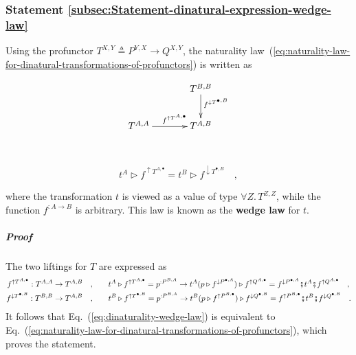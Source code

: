 \subsubsection{Statement \label{subsec:Statement-dinatural-expression-wedge-law}\ref{subsec:Statement-dinatural-expression-wedge-law}}

Using the profunctor $T^{X,Y}\triangleq P^{Y,X}\rightarrow Q^{X,Y}$,
the naturality law~(\ref{eq:naturality-law-for-dinatural-transformations-of-profunctors})
is written as

\begin{wrapfigure}[9]{l}{0.24\columnwidth}%
\vspace{-1.5\baselineskip}
\[
\xymatrix{\xyScaleY{2.0pc}\xyScaleX{3.0pc} & T^{B,B}\ar[d]\sp(0.37){f^{\downarrow T^{\bullet,B}}}\\
T^{A,A}\ar[r]\sp(0.5){~~~f^{\uparrow T^{A,\bullet}}} & T^{A,B}
}
\]

\vspace{-0\baselineskip}
\end{wrapfigure}%

~\vspace{-0.8\baselineskip}

\begin{equation}
t^{A}\triangleright f^{\uparrow T^{A,\bullet}}=t^{B}\triangleright f^{\downarrow T^{\bullet,B}}\quad,\label{eq:dinaturality-wedge-law}
\end{equation}
\vspace{-0.8\baselineskip}

\noindent where the transformation $t$ is viewed as a value of type
$\forall Z.\,T^{Z,Z}$, while the function $f^{:A\rightarrow B}$
is arbitrary. This law is known as the \textbf{wedge law}
for $t$.

\subparagraph{Proof}

The two liftings for $T$ are expressed as
\begin{align*}
f^{\uparrow T^{A,\bullet}}:T^{A,A}\rightarrow T^{A,B}\quad, & \quad\quad t^{A}\triangleright f^{\uparrow T^{A,\bullet}}=p^{:P^{B,A}}\rightarrow t^{A}(p\triangleright f^{\downarrow P^{\bullet,A}})\triangleright f^{\uparrow Q^{A,\bullet}}=f^{\downarrow P^{\bullet,A}}\bef t^{A}\bef f^{\uparrow Q^{A,\bullet}}\quad,\\
f^{\downarrow T^{\bullet,B}}:T^{B,B}\rightarrow T^{A,B}\quad, & \quad\quad t^{B}\triangleright f^{\uparrow T^{\bullet,B}}=p^{:P^{B,A}}\rightarrow t^{B}(p\triangleright f^{\uparrow P^{B,\bullet}})\triangleright f^{\downarrow Q^{\bullet,B}}=f^{\uparrow P^{B,\bullet}}\bef t^{B}\bef f^{\downarrow Q^{\bullet,B}}\quad.
\end{align*}
It follows that Eq.~(\ref{eq:dinaturality-wedge-law}) is equivalent
to Eq.~(\ref{eq:naturality-law-for-dinatural-transformations-of-profunctors}),
which proves the statement.

